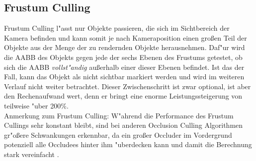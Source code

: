 \documentclass[journal]{vgtc}
\begin{document}
\subsection{Frustum Culling}
Frustum Culling l"asst nur Objekte passieren, die sich im Sichtbereich der Kamera befinden und kann somit je nach Kameraposition einen gro{\ss}en Teil der Objekte aus der Menge der zu rendernden Objekte herausnehmen.
Daf"ur wird die AABB des Objekts gegen jede der sechs Ebenen des Frustums getestet, ob sich die AABB \textit{vollst"andig} au{\ss}erhalb einer dieser Ebenen befindet.
Ist das der Fall, kann das Objekt als nicht sichtbar markiert werden und wird im weiteren Verlauf nicht weiter betrachtet. Dieser Zwischenschritt ist zwar optional, ist aber den Rechenaufwand wert, denn er bringt eine enorme Leistungssteigerung von teilweise "uber 200\%.\\
Anmerkung zum Frustum Culling: W"ahrend die Performance des Frustum Cullings sehr konstant bleibt, sind bei anderen Occlusion Culling Algorithmen gr"o\ss{}ere Schwankungen erkennbar, da ein gro\ss{}er Occluder im Vordergrund potenziell alle Occludees hinter ihm "uberdecken kann und damit die Berechnung stark vereinfacht \cite{MSOC}.\\
\end{document}
